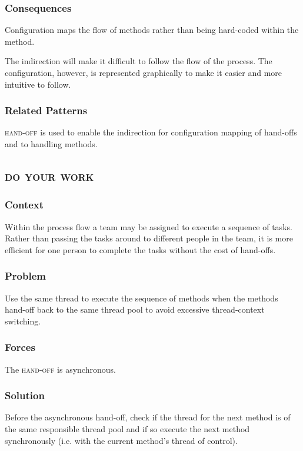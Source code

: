 \documentclass[prodmode]{style/acmlarge}
\begin{document}
\subsubsection*{Consequences} Configuration maps the flow of methods rather than
being hard-coded within the method.

The indirection will make it difficult to follow the flow of the process.  The
configuration, however, is represented graphically to make it easier and more
intuitive to follow.

\subsubsection*{Related Patterns} \textsc{hand-off} is used to enable the
indirection for configuration mapping of hand-offs and to handling methods.



\subsection{\textsc{\textbf{do your work}}}

\subsubsection*{Context} Within the process flow a team may be assigned to
execute a sequence of tasks. Rather than passing the tasks around to different
people in the team, it is more efficient for one person to complete the tasks
without the cost of hand-offs.

\subsubsection*{Problem} Use the same thread to execute the sequence of methods
when the methods hand-off back to the same thread pool to avoid excessive
thread-context switching.

\subsubsection*{Forces} The \textsc{hand-off} is asynchronous.

\subsubsection*{Solution} Before the asynchronous hand-off, check if the thread
for the next method is of the same responsible thread pool and if so execute the
next method synchronously (i.e. with the current method's thread of control).
\end{document}
